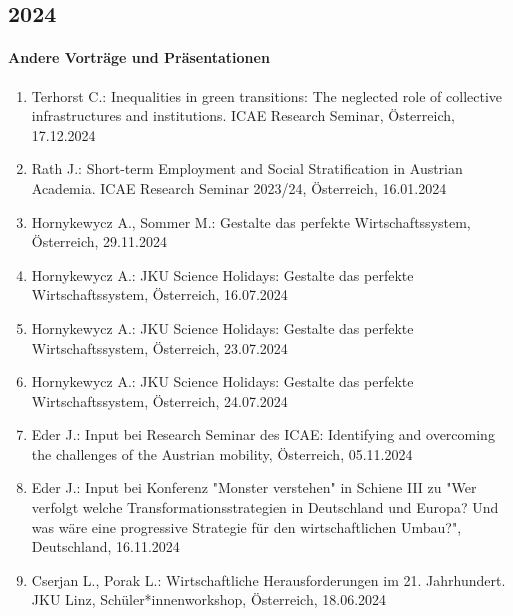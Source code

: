 \subsection*{2024}

    \paragraph{Andere Vorträge und Präsentationen}
\begin{enumerate}
	\item Terhorst C.: Inequalities in green transitions: The neglected role of collective infrastructures and institutions. ICAE Research Seminar, Österreich, 17.12.2024
	\item Rath J.: Short-term Employment and Social Stratification in Austrian Academia. ICAE Research Seminar 2023/24, Österreich, 16.01.2024
	\item Hornykewycz A., Sommer M.: Gestalte das perfekte Wirtschaftssystem, Österreich, 29.11.2024
	\item Hornykewycz A.: JKU Science Holidays: Gestalte das perfekte Wirtschaftssystem, Österreich, 16.07.2024
	\item Hornykewycz A.: JKU Science Holidays: Gestalte das perfekte Wirtschaftssystem, Österreich, 23.07.2024
	\item Hornykewycz A.: JKU Science Holidays: Gestalte das perfekte Wirtschaftssystem, Österreich, 24.07.2024
	\item Eder J.: Input bei Research Seminar des ICAE: Identifying and overcoming the challenges of the Austrian mobility, Österreich, 05.11.2024
	\item Eder J.: Input bei Konferenz "Monster verstehen" in Schiene III zu "Wer verfolgt welche Transformationsstrategien in Deutschland und Europa? Und was wäre eine progressive Strategie für den wirtschaftlichen Umbau?", Deutschland, 16.11.2024
	\item Cserjan L., Porak L.: Wirtschaftliche Herausforderungen im 21. Jahrhundert. JKU Linz, Schüler*innenworkshop, Österreich, 18.06.2024
\end{enumerate}
